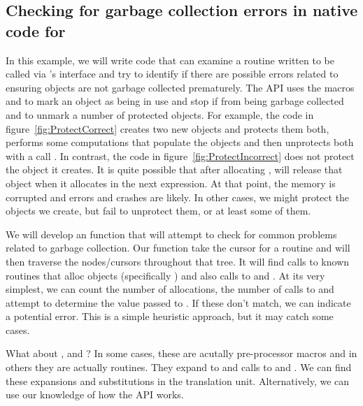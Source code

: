 \subsection[Checking for garbage collection errors in native code for R]{Checking for garbage collection errors in native code for \R{}}
In this example, we will write code that can examine a \C{} routine
written to be called via \R's  interface and try to
identify if there are possible errors related to ensuring \R{} objects
are not garbage collected prematurely.  The \R{} API uses the macros
 and  to mark an object as being in
use and stop if from being garbage collected and to unmark a number of
protected objects.  For example, the \C{} code in
figure~\ref{fig:ProtectCorrect} creates two new \R{} objects and
protects them both, performs some computations that populate the
objects and then unprotects both with a call .  In
contrast, the code in figure~\ref{fig:ProtectIncorrect} does not
protect the \R{} object it creates.  It is quite possible that after
allocating , \R{} will release that object when it allocates
 in the next expression. At that point, the memory is
corrupted and errors and crashes are likely.
In other cases, we might protect the \R{} objects we create,
but fail to unprotect them, or at least some of them.



We will develop an \R{} function that will attempt to check for common
problems related to garbage collection.  Our function take the
\libclang{} cursor for a routine and will then traverse the
nodes/cursors throughout that tree. It will find calls to known
routines that alloc \R{} objects (specifically )
and also calls to  and .  At its
very simplest, we can count the number of allocations, the number of
calls to  and attempt to determine the value passed
to .  If these don't match, we can indicate a
potential error.  This is a simple heuristic approach, but it may
catch some cases.

What about ,  and ?
In some cases, these are acutally pre-processor macros and in others
they are actually routines. They expand to
 and calls to  and
.  We can find these expansions and substitutions
in the translation unit. Alternatively, we can use our knowledge of
how the \R{} API works.


